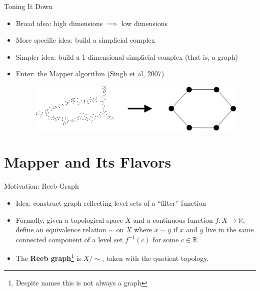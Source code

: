 \documentclass{beamer}
\begin{document}
\begin{frame}{Toning It Down}
  \begin{itemize}
    \item Broad idea: high dimensions $\implies$ low dimensions
    \item More specific idea: build a simplicial complex
    \item Simpler idea: build a 1-dimensional simplicial complex (that is, a graph)
    \item Enter: the Mapper algorithm (Singh et al, 2007) \cite{mapper}
    \vspace*{.5cm}
  \begin{figure}
    \begin{center}
      \hspace*{-1cm}\includegraphics[width=1\textwidth]{datatograph.png}
    \end{center}
  \end{figure}
  \end{itemize}
\end{frame}

\section{Mapper and Its Flavors}
\begin{frame}{Motivation: Reeb Graph}
  \begin{itemize}
    \item Idea: construct graph reflecting level sets of a ``filter'' function
    \item Formally, given a topological space $X$ and a continuous function 
    $f: X\to\mathbb{R}$, define an equivalence relation $\sim$ on $X$ where $x\sim y$ if $x$ and $y$ live in the same connected component of a level set $f^{-1}(c)$ for some $c\in\mathbb{R}$.
    \item The \textbf{Reeb graph}\footnote{Despite names this is not always a graph} is $X/\sim$, taken with the quotient topology.
  \end{itemize}
\end{frame}
\end{document}
